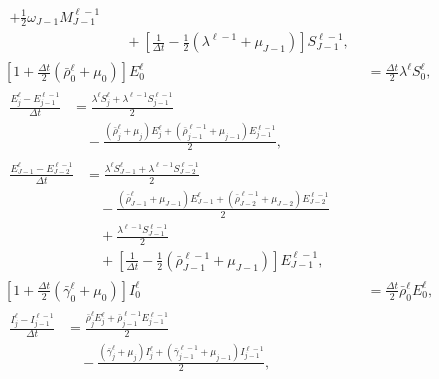 \documentclass{jpmarticle}
\let\subequationsorig\subequations%
\let\endsubequationsorig\endsubequations%
\renewenvironment{subequations}{
  \subequationsorig
  \renewcommand{\theequation}{\theparentequation.\arabic{equation}}
}{
  \endsubequationsorig
}
\begin{document}
\begin{subequations}
\begin{align}
\begin{split}
      + \frac{1}{2} \omega_{J - 1} M_{J - 1}^{\ell - 1}
      \\ & \quad {}
      + \left[\frac{1}{\Delta t}
        - \frac{1}{2} (\lambda^{\ell - 1} + \mu_{J - 1})\right]
      S_{J - 1}^{\ell - 1},
    \end{split}
    \\
    \left[1 + \frac{\Delta t}{2} (\bar{\rho}_0^{\ell} + \mu_0)\right]
    E_0^{\ell}
    &= \frac{\Delta t}{2} \lambda^{\ell} S_0^{\ell},
    \\
    \begin{split}
      \frac{E_j^{\ell} - E_{j - 1}^{\ell - 1}}{\Delta t}
      &= \frac{\lambda^{\ell} S_j^{\ell}
        + \lambda^{\ell - 1} S_{j - 1}^{\ell - 1}}
      {2}
      \\ & \quad {}
      - \frac{(\bar{\rho}_j^{\ell} + \mu_j) E_j^{\ell}
        + (\bar{\rho}_{j - 1}^{\ell - 1} + \mu_{j - 1}) E_{j - 1}^{\ell - 1}}
      {2},
    \end{split}
    \\
    \begin{split}
      \frac{E_{J - 1}^{\ell} - E_{J - 2}^{\ell - 1}}{\Delta t}
      &= \frac{\lambda^{\ell} S_{J - 1}^{\ell}
        + \lambda^{\ell - 1} S_{J - 2}^{\ell - 1}}
      {2}
      \\ & \quad {}
      - \frac{(\bar{\rho}_{J - 1}^{\ell} + \mu_{J - 1}) E_{J - 1}^{\ell}
        + (\bar{\rho}_{J - 2}^{\ell - 1} + \mu_{J - 2}) E_{J - 2}^{\ell - 1}}
      {2}
      \\ & \quad {}
      + \frac{\lambda^{\ell - 1} S_{J - 1}^{\ell - 1}}{2}
      \\ & \quad {}
      + \left[
        \frac{1}{\Delta t}
        - \frac{1}{2} (\bar{\rho}_{J - 1}^{\ell - 1} + \mu_{J - 1})
      \right] E_{J - 1}^{\ell - 1},
    \end{split}
    \\
    \left[1 + \frac{\Delta t}{2} (\bar{\gamma}_0^{\ell} + \mu_0)\right]
    I_0^{\ell}
    &= \frac{\Delta t}{2} \bar{\rho}_0^{\ell} E_0^{\ell},
    \\
    \begin{split}
      \frac{I_j^{\ell} - I_{j - 1}^{\ell - 1}}{\Delta t}
      &= \frac{\bar{\rho}_j^{\ell} E_j^{\ell}
        + \bar{\rho}_{j - 1}^{\ell - 1} E_{j - 1}^{\ell - 1}} {2}
      \\ & \quad {}
      - \frac{(\bar{\gamma}_j^{\ell} + \mu_j) I_j^{\ell}
        + (\bar{\gamma}_{j - 1}^{\ell - 1} + \mu_{j - 1}) I_{j - 1}^{\ell - 1}}
      {2},
    \end{split}

\end{align}
\end{subequations}
\end{document}
